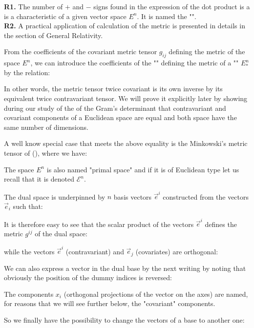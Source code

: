 	\begin{tcolorbox}[title=Remarks,colframe=black,arc=10pt]
	\textbf{R1.} The number of $+$ and $-$ signs found in the expression of the dot product is a is a characteristic of a given vector space $E^n$. It is named the "".\\
	
	\textbf{R2.} A practical application of calculation of the metric is presented in details in the section of General Relativity.\\
	\end{tcolorbox}
	From the coefficients of the covariant metric tensor $g_{ij}$ defining the metric of the space $E^n$, we can introduce the coefficients of the "" defining the metric of a "" $E_{*}^n$ by the relation:
	
	In other words, the metric tensor twice covariant is its own inverse by its equivalent twice contravariant tensor. We will prove it explicitly later by showing during our study of the of the Gram's determinant that contravariant and covariant components of a Euclidean space are equal and both space have the same number of dimensions.

	A well know special case that meets the above equality is the Minkowski's metric tensor of (), where we have:
	 
	\begin{tcolorbox}[title=Remark,colframe=black,arc=10pt]
	The space $E^n$ is also named "primal space" and if it is of Euclidean type let us recall that it is denoted $\mathcal{E}^n$.
	\end{tcolorbox}
	The dual space is underpinned by $n$ basis vectors $\vec{e}^i$ constructed from the vectors $\vec{e}_i$ such that:
	
	It is therefore easy to see that the scalar product of the vectors $\vec{e}^i$ defines the metric $g^{ij}$ of the dual space:
	
	while the vectors $\vec{e}^i$ (contravariant) and $\vec{e}_j$ (covariates) are orthogonal:
	
	We can also express a vector in the dual base by the next writing by noting that obviously the position of the dummy indices is reversed:
	
	\begin{tcolorbox}[title=Remark,colframe=black,arc=10pt]
	The components $x_i$ (orthogonal projections of the vector on the axes) are named, for reasons that we will see further below, the "covariant" components.
	\end{tcolorbox}
	So we finally have the possibility to change the vectors of a base to another one:
	
